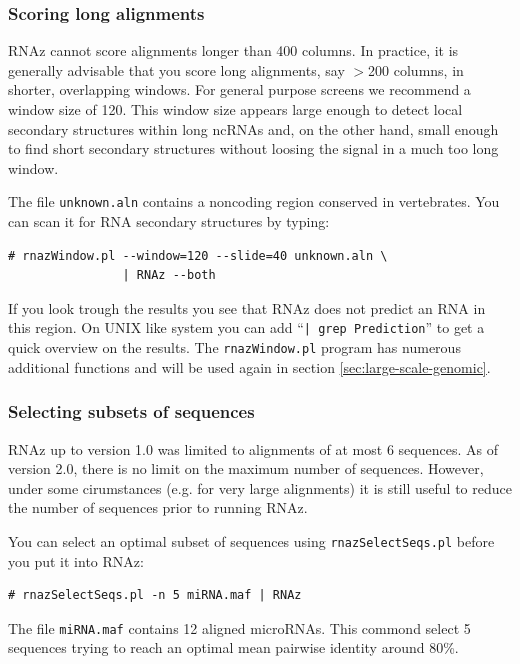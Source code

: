 \documentclass[11pt]{article}
\begin{document}
\subsubsection{Scoring long alignments}
\label{sec:scor-long-alignm}

RNAz cannot score alignments longer than 400 columns. In practice, it is
generally advisable that you score long alignments, say $>$200 columns, in
shorter, overlapping windows. For general purpose screens we recommend a
window size of 120. This window size appears large enough to detect local
secondary structures within long ncRNAs and, on the other hand, small
enough to find short secondary structures without loosing the signal in a
much too long window.

The file \texttt{unknown.aln} contains a noncoding region conserved in
vertebrates. You can scan it for RNA secondary structures by typing:

\begin{verbatim}
# rnazWindow.pl --window=120 --slide=40 unknown.aln \
                | RNAz --both 
\end{verbatim}

If you look trough the results you see that RNAz does not predict an RNA in
this region. On UNIX like system you can add ``\texttt{| grep Prediction}''
to get a quick overview on the results. The \texttt{rnazWindow.pl} program
has numerous additional functions and will be used again in section
\ref{sec:large-scale-genomic}.

\subsubsection{Selecting subsets of sequences}
\label{sec:scor-large-alignm}

RNAz up to version 1.0 was limited to alignments of at most 6
sequences. As of version 2.0, there is no limit on the maximum number
of sequences. However, under some cirumstances (e.g. for very large
alignments) it is still useful to reduce the number of sequences prior
to running RNAz.

You can select an optimal subset of sequences using
\texttt{rnazSelectSeqs.pl} before you put it into RNAz:

\begin{verbatim}
# rnazSelectSeqs.pl -n 5 miRNA.maf | RNAz
\end{verbatim}

The file \texttt{miRNA.maf} contains 12 aligned microRNAs. This
commond select 5 sequences trying to reach an optimal mean pairwise
identity around 80\%.
\end{document}
